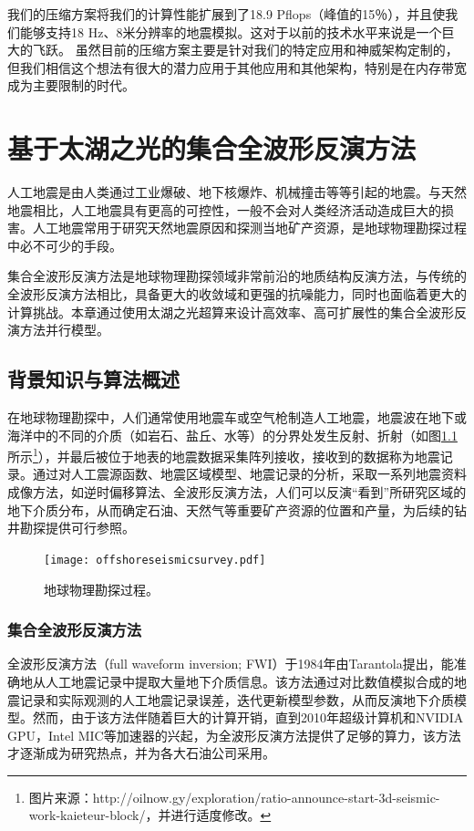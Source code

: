 \documentclass[degree=doctor]{thuthesis}
\begin{document}
我们的压缩方案将我们的计算性能扩展到了18.9 Pflops（峰值的15％），并且使我们能够支持18 Hz、8米分辨率的地震模拟。这对于以前的技术水平来说是一个巨大的飞跃。 虽然目前的压缩方案主要是针对我们的特定应用和神威架构定制的，但我们相信这个想法有很大的潜力应用于其他应用和其他架构，特别是在内存带宽成为主要限制的时代。

\chapter{基于太湖之光的集合全波形反演方法}

人工地震是由人类通过工业爆破、地下核爆炸、机械撞击等等引起的地震。与天然地震相比，人工地震具有更高的可控性，一般不会对人类经济活动造成巨大的损害。人工地震常用于研究天然地震原因和探测当地矿产资源，是地球物理勘探过程中必不可少的手段。

集合全波形反演方法是地球物理勘探领域非常前沿的地质结构反演方法，与传统的全波形反演方法相比，具备更大的收敛域和更强的抗噪能力，同时也面临着更大的计算挑战。本章通过使用太湖之光超算来设计高效率、高可扩展性的集合全波形反演方法并行模型。

\section{背景知识与算法概述}

在地球物理勘探中，人们通常使用地震车或空气枪制造人工地震，地震波在地下或海洋中的不同的介质（如岩石、盐丘、水等）的分界处发生反射、折射（如图\ref{fig:offshoreseismicsurvey}所示\footnote{图片来源：http://oilnow.gy/exploration/ratio-announce-start-3d-seismic-work-kaieteur-block/，并进行适度修改。}），并最后被位于地表的地震数据采集阵列接收，接收到的数据称为地震记录。通过对人工震源函数、地震区域模型、地震记录的分析，采取一系列地震资料成像方法，如逆时偏移算法、全波形反演方法，人们可以反演“看到”所研究区域的地下介质分布，从而确定石油、天然气等重要矿产资源的位置和产量，为后续的钻井勘探提供可行参照。

\begin{figure}[ht]
  \centering
  \texttt{[image: offshoreseismicsurvey.pdf]}
  \caption{地球物理勘探过程。}
  \label{fig:offshoreseismicsurvey}
\end{figure}

\subsection{集合全波形反演方法}

全波形反演方法（full waveform inversion; FWI）于1984年由Tarantola提出，能准确地从人工地震记录中提取大量地下介质信息\cite{tarantola1984inversion,plessix2012full,brossier2009seismic}。该方法通过对比数值模拟合成的地震记录和实际观测的人工地震记录误差，迭代更新模型参数，从而反演地下介质模型\cite{yushu}。然而，由于该方法伴随着巨大的计算开销，直到2010年超级计算机和NVIDIA GPU，Intel MIC等加速器的兴起，为全波形反演方法提供了足够的算力，该方法才逐渐成为研究热点，并为各大石油公司采用。
\end{document}

